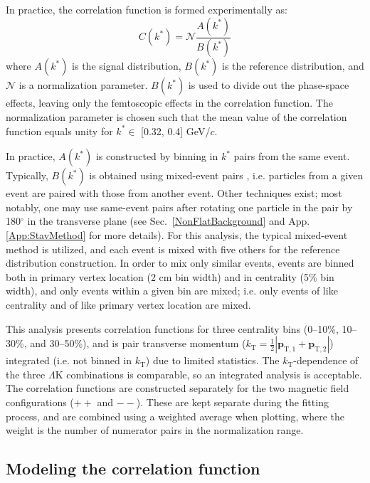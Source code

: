 \documentclass[ALICE,manyauthors]{cernphprep}
\newcommand{\kstar}{$k^{*}$\xspace}
\newcommand{\LamK}{$\Lambda$K\xspace}
\begin{document}
In practice, the correlation function is formed experimentally as:
\begin{equation}
  C(k^{*}) = \mathcal{N}\frac{A(k^{*})}{B(k^{*})}
\label{eqn:CfExp}
\end{equation}
where $A(k^{*})$ is the signal distribution, $B(k^{*})$ is the reference distribution, and $\mathcal{N}$ is a normalization parameter.  
$B(k^{*})$ is used to divide out the phase-space effects, leaving only the femtoscopic effects in the correlation function. 
The normalization parameter is chosen such that the mean value of the correlation function equals unity for \kstar $\in$ [0.32, 0.4] GeV/$c$.


In practice, $A(k^{*})$ is constructed by binning in \kstar pairs from the same event.
Typically, $B(k^{*})$ is obtained using mixed-event pairs \cite{Kopylov:1974th}, i.e. particles from a given event are paired with those from another event.
Other techniques exist; most notably, one may use same-event pairs after rotating one particle in the pair by 180$^\circ$ in the transverse plane (see Sec.\ \ref{NonFlatBackground} and App. \ref{App:StavMethod} for more details).
For this analysis, the typical mixed-event method is utilized, and each event is mixed with five others for the reference distribution construction.
In order to mix only similar events, events are binned both in primary vertex location (2 cm bin width) and in centrality (5\% bin width), and only events within a given bin are mixed; i.e. only events of like centrality and of like primary vertex location are mixed.

This analysis presents correlation functions for three centrality bins (0--10\%, 10--30\%, and 30--50\%), and is pair transverse momentum ($k_{\mathrm{T}} = \frac{1}{2}|\mathbf{p}_{\mathrm{T,1}}+\mathbf{p}_{\mathrm{T,2}}|$) integrated (i.e. not binned in $k_{\mathrm{T}}$) due to limited statistics.
The $k_{\mathrm{T}}$-dependence of the three \LamK combinations is comparable, so an integrated analysis is acceptable.
The correlation functions are constructed separately for the two magnetic field configurations ($++$ and $--$).
These are kept separate during the fitting process, and are combined using a weighted average when plotting, where the weight is the number of numerator pairs in the normalization range.

\subsection{Modeling the correlation function}
\label{sec:ModelingCF}
\end{document}
